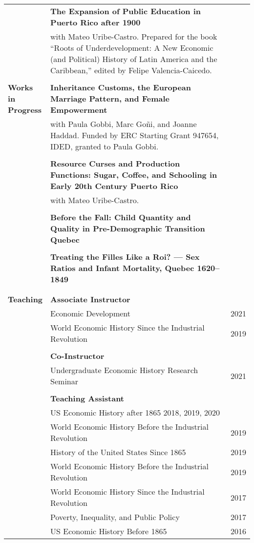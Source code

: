 \documentclass[a4paper,11pt,oneside]{article}
\begin{document}
\begin{longtable}{@{} p{0.175\linewidth} p{0.775\linewidth} p{0.05\linewidth}}
      & \textbf{The Expansion of Public Education in Puerto Rico after 1900} &\\

      & with Mateo Uribe-Castro. Prepared for the book ``Roots of Underdevelopment: A New Economic (and Political) History of Latin America and the Caribbean,'' edited by Felipe Valencia-Caicedo. & \\
  \\


     
     \textbf{\large{Works in \(\phantom{1}\) Progress}}           & \textbf{Inheritance Customs, the European Marriage Pattern, and Female Empowerment}\\ 
     &  with Paula Gobbi, Marc Go\~{n}i, and Joanne Haddad. Funded by ERC Starting Grant 947654, IDED, granted to Paula Gobbi. &  \\
       \\
       &  \textbf{Resource Curses and Production Functions: Sugar, Coffee, and Schooling in Early 20th Century Puerto Rico} \\ 
      &  with  Mateo Uribe-Castro. \\
      \\
      &  \textbf{Before the Fall: Child Quantity and Quality in
      Pre-Demographic Transition Quebec} \\ 
      &   \\
      &  \textbf{Treating the Filles Like a Roi? --- Sex Ratios and Infant Mortality, Quebec 1620--1849} \\ 
      &   \\
      \\


     \textbf{\large{Teaching}} &  \textbf{Associate Instructor} & \\
      & Economic Development & \hfill 2021\\
     &  World Economic History Since the Industrial Revolution &\hfill 2019\\
     \\ 
     &   \textbf{Co-Instructor} \\
     & Undergraduate Economic History Research Seminar & \hfill  2021 \\
     \\ 
     & \textbf{Teaching Assistant} &\\

     &  \multicolumn{2}{l}{ US Economic History after 1865 \hfill 2018, 2019, 2020 }\\
     &  World Economic History Before the Industrial Revolution & \hfill 2019\\
     &  History of the United States Since 1865 & \hfill 2019\\
     &  World Economic History Before the Industrial Revolution & \hfill 2019\\
     &  World Economic History Since the Industrial Revolution & \hfill 2017\\
     &  Poverty, Inequality, and Public Policy & \hfill 2017\\
     &  US Economic History Before 1865 & \hfill 2016 \\


\end{longtable}
\end{document}
